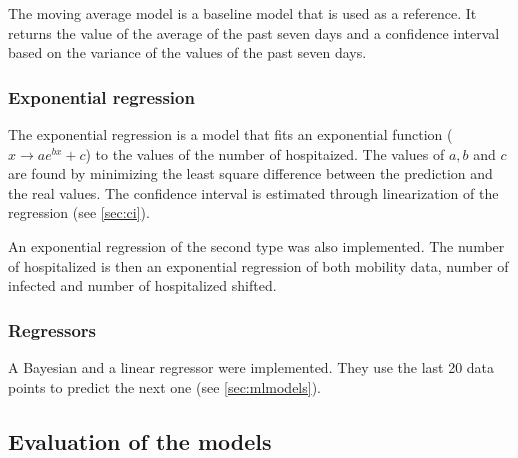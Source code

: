 The moving average model is a baseline model that is used as a reference. 
It returns the value of the average of the past seven days and a confidence interval based on the variance of the values of the past seven days. 


\subsubsection{Exponential regression}

The exponential regression is a model that fits an exponential function ($x \rightarrow a e^{b x} + c$) to the values of the number of hospitaized. 
The values of $a, b$ and $c$ are found by minimizing the least square difference between the prediction and the real values. 
The confidence interval is estimated through linearization of the regression (see \ref{sec:ci}). 

An exponential regression of the second type was also implemented. 
The number of hospitalized is then an exponential regression of both mobility data, number of infected and number of hospitalized shifted. 


\subsubsection{Regressors}

A Bayesian and a linear regressor were implemented.
They use the last 20 data points to predict the next one (see \ref{sec:mlmodels}). 


\subsection*{Evaluation of the models}

